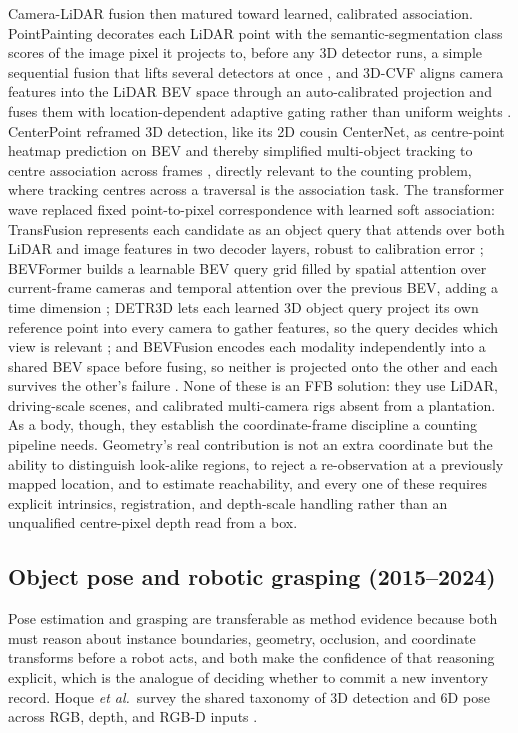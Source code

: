 Camera-LiDAR fusion then matured toward learned, calibrated association. PointPainting decorates each LiDAR point with the semantic-segmentation class scores of the image pixel it projects to, before any 3D detector runs, a simple sequential fusion that lifts several detectors at once \cite{vora2020pointpainting}, and 3D-CVF aligns camera features into the LiDAR BEV space through an auto-calibrated projection and fuses them with location-dependent adaptive gating rather than uniform weights \cite{yoo20203dcvf}. CenterPoint reframed 3D detection, like its 2D cousin CenterNet, as centre-point heatmap prediction on BEV and thereby simplified multi-object tracking to centre association across frames \cite{yin2021centerpoint}, directly relevant to the counting problem, where tracking centres across a traversal is the association task. The transformer wave replaced fixed point-to-pixel correspondence with learned soft association: TransFusion represents each candidate as an object query that attends over both LiDAR and image features in two decoder layers, robust to calibration error \cite{bai2022transfusion}; BEVFormer builds a learnable BEV query grid filled by spatial attention over current-frame cameras and temporal attention over the previous BEV, adding a time dimension \cite{li2022bevformer}; DETR3D lets each learned 3D object query project its own reference point into every camera to gather features, so the query decides which view is relevant \cite{wang2022detr3d}; and BEVFusion encodes each modality independently into a shared BEV space before fusing, so neither is projected onto the other and each survives the other's failure \cite{liu2023bevfusion}. None of these is an FFB solution: they use LiDAR, driving-scale scenes, and calibrated multi-camera rigs absent from a plantation. As a body, though, they establish the coordinate-frame discipline a counting pipeline needs. Geometry's real contribution is not an extra coordinate but the ability to distinguish look-alike regions, to reject a re-observation at a previously mapped location, and to estimate reachability, and every one of these requires explicit intrinsics, registration, and depth-scale handling rather than an unqualified centre-pixel depth read from a box.

\subsection{Object pose and robotic grasping (2015--2024)}

Pose estimation and grasping are transferable as method evidence because both must reason about instance boundaries, geometry, occlusion, and coordinate transforms before a robot acts, and both make the confidence of that reasoning explicit, which is the analogue of deciding whether to commit a new inventory record. Hoque \textit{et al.}\ survey the shared taxonomy of 3D detection and 6D pose across RGB, depth, and RGB-D inputs \cite{hoque2021posesurvey}.

